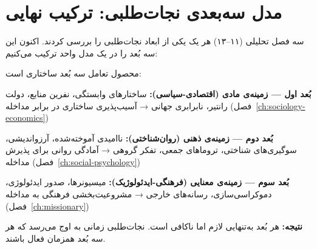 \section{مدل سه‌بعدی نجات‌طلبی: ترکیب نهایی}
\label{sec:ch14-3d-model}

سه فصل تحلیلی (۱۱–۱۳) هر یک یکی از ابعاد نجات‌طلبی را بررسی کردند. اکنون این سه بُعد را در یک مدل واحد ترکیب می‌کنیم:

\begin{tcolorbox}[defbox, title={مدل سه‌بعدی نجات‌طلبی}]
 محصول تعامل سه بُعد ساختاری است:

\textbf{بُعد اول — زمینه‌ی مادی (اقتصادی-سیاسی):}
ساختارهای وابستگی، نفرین منابع، دولت رانتیر، نابرابری جهانی → آسیب‌پذیری ساختاری در برابر مداخله (فصل~\ref{ch:sociology-economics})

\textbf{بُعد دوم — زمینه‌ی ذهنی (روان‌شناختی):}
ناامیدی آموخته‌شده، آرزواندیشی، سوگیری‌های شناختی، تروماهای جمعی، تفکر گروهی → آمادگی روانی برای پذیرش مداخله (فصل~\ref{ch:social-psychology})

\textbf{بُعد سوم — زمینه‌ی معنایی (فرهنگی-ایدئولوژیک):}
میسیونرها، صدور ایدئولوژی، دموکراسی‌سازی، رسانه‌های خارجی → مشروعیت‌بخشی فرهنگی به مداخله (فصل~\ref{ch:missionary})

\textbf{نتیجه:} هر بُعد به‌تنهایی لازم اما ناکافی است. نجات‌طلبی زمانی به اوج می‌رسد که هر سه بُعد همزمان فعال باشند.
\end{tcolorbox}


